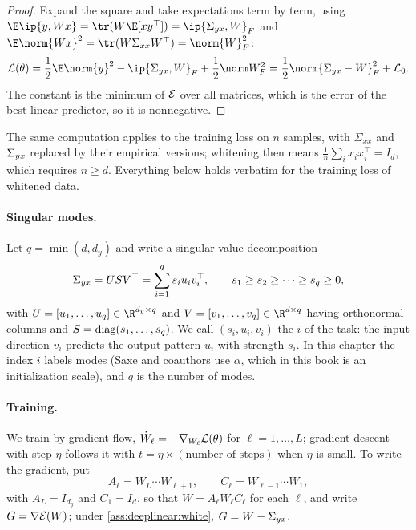 \begin{refsection}

\begin{proof}
Expand the square and take expectations term by term, using $\E\ip{y,Wx}=\tr(W\E[xy^\top])=\ip{\dlS,W}_F$ and $\E\norm{Wx}^2=\tr(W\Sigma_{xx}W^\top)=\norm{W}_F^2$:
\[
  \Loss(\theta)=\frac12\E\norm{y}^2-\ip{\dlS,W}_F+\frac12\norm W_F^2=\frac12\norm{\dlS-W}_F^2+\dlLzero .
\]
The constant is the minimum of $\mathcal{E}$ over all matrices, which is the error of the best linear predictor, so it is nonnegative.
\end{proof}

The same computation applies to the training loss on $n$ samples, with $\Sigma_{xx}$ and $\Sigma_{yx}$ replaced by their empirical versions; whitening then means $\frac1n\sum_ix_ix_i^\top=I_d$, which requires $n\ge d$. Everything below holds verbatim for the training loss of whitened data.

\paragraph{Singular modes.} Let $q=\min(d,d_y)$ and write a singular value decomposition
\begin{equation}\label{eq:deeplinear:svd}
  \Sigma_{yx}=USV^\top=\sum_{i=1}^qs_iu_iv_i^\top,\qquad s_1\ge s_2\ge\dots\ge s_q\ge0,
\end{equation}
with $U=[u_1,\dots,u_q]\in\R^{d_y\times q}$ and $V=[v_1,\dots,v_q]\in\R^{d\times q}$ having orthonormal columns and $S=\operatorname{diag}(s_1,\dots,s_q)$. We call $(s_i,u_i,v_i)$ the  $i$ of the task: the input direction $v_i$ predicts the output pattern $u_i$ with strength $s_i$. In this chapter the index $i$ labels modes (Saxe and coauthors use $\alpha$, which in this book is an initialization scale), and $q$ is the number of modes.

\paragraph{Training.} We train by gradient flow, $\dot W_\ell=-\nabla_{W_\ell}\mathcal{L}(\theta)$ for $\ell=1,\dots,L$; gradient descent with step $\eta$ follows it with $t=\eta\times(\text{number of steps})$ when $\eta$ is small. To write the gradient, put
\[
  A_\ell=W_L\cdots W_{\ell+1},\qquad C_\ell=W_{\ell-1}\cdots W_1,
\]
with $A_L=I_{d_y}$ and $C_1=I_d$, so that $W=A_\ell W_\ell C_\ell$ for each $\ell$, and write $G=\nabla\mathcal{E}(W)$; under \cref{ass:deeplinear:white}, $G=W-\Sigma_{yx}$.


\end{refsection}
